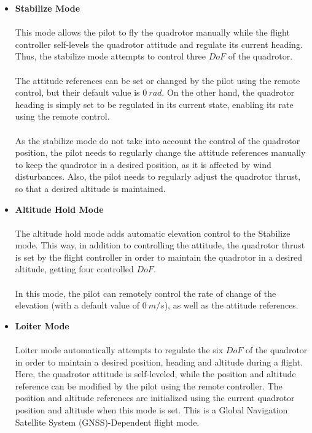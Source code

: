 \begin{itemize}
\item \textbf{Stabilize Mode}\\\\
This mode allows the pilot to fly the quadrotor manually while the flight controller self-levels the quadrotor attitude and regulate its current heading. Thus, the stabilize mode attempts to control three $DoF$ of the quadrotor.\\\\
The attitude references can be set or changed by the pilot using the remote control, but their default value is $0\ rad$. On the other hand, the quadrotor heading is simply set to be regulated in its current state, enabling its rate using the remote control.
\\\\
As the stabilize mode do not take into account the control of the quadrotor position, the pilot needs to regularly change the attitude references manually to keep the quadrotor in a desired position, as it is affected by wind disturbances. Also, the pilot needs to regularly adjust the quadrotor thrust, so that a desired altitude is maintained.

\item \textbf{Altitude Hold Mode}\\\\
The altitude hold mode adds automatic elevation control to the Stabilize mode. This way, in addition to controlling the attitude, the quadrotor thrust is set by the flight controller in order to maintain the quadrotor in a desired altitude, getting four controlled $DoF$.
\\\\
In this mode, the pilot can remotely control the rate of change of the elevation (with a default value of $0\ m/s$), as well as the attitude references.

\item \textbf{Loiter Mode}\\\\
Loiter mode automatically attempts to regulate the six $DoF$ of the quadrotor in order to maintain a desired position, heading and altitude during a flight. Here, the quadrotor attitude is self-leveled, while the position and altitude reference can be modified by the pilot using the remote controller. The position and altitude references are initialized using the current quadrotor position and altitude when this mode is set. This is a Global Navigation Satellite System (GNSS)-Dependent flight mode.


\end{itemize}
